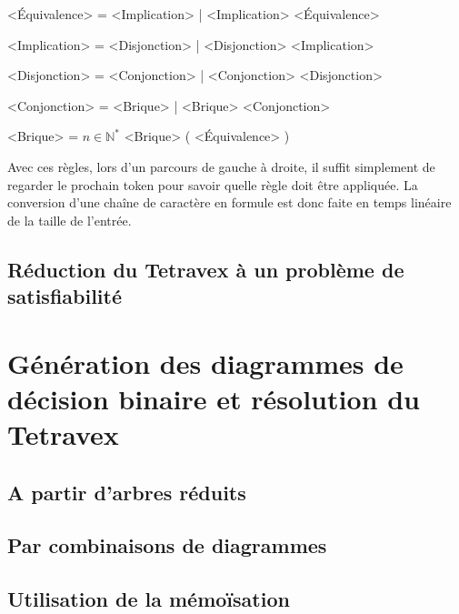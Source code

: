 \documentclass[11pt]{article}
\begin{document}
\setlength{\grammarparsep}{0.3em}
\begin{grammar}

<Équivalence> = <Implication> | <Implication> \Leftrightarrow{} <Équivalence>

<Implication> = <Disjonction> | <Disjonction> \Rightarrow{} <Implication>

<Disjonction> = <Conjonction> | <Conjonction> \lor{} <Disjonction>

<Conjonction> = <Brique> | <Brique> \land{} <Conjonction>

<Brique> = $n \in{} \mathbb{N}^{*}$
\alt \top
\alt \bot
\alt \neg <Brique>
\alt ( <Équivalence> )

\end{grammar}

Avec ces règles, lors d'un parcours de gauche à droite, il suffit simplement de regarder le prochain token pour savoir quelle règle doit être appliquée.
La conversion d'une chaîne de caractère en formule est donc faite en temps linéaire de la taille de l'entrée.

\subsection{Réduction du Tetravex à un problème de satisfiabilité}

\section{Génération des diagrammes de décision binaire et résolution du Tetravex}
\subsection{A partir d'arbres réduits}
\subsection{Par combinaisons de diagrammes}
\subsection{Utilisation de la mémoïsation}
\end{document}
